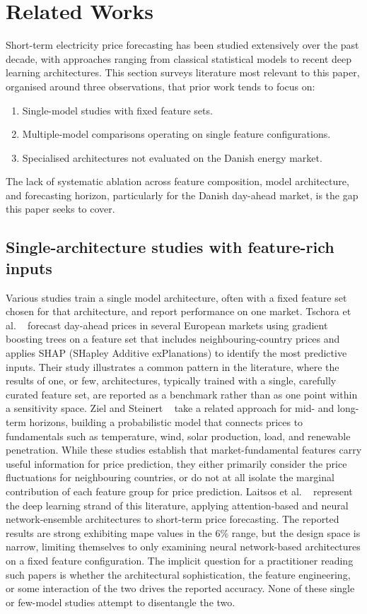 \section{Related Works} \label{sec:related-works}
Short-term electricity price forecasting has been studied
extensively over the past decade, with approaches ranging from
classical statistical models to recent deep 
learning architectures.
This section surveys literature most relevant to this paper,
organised around three observations, that prior work tends to
focus on:
\begin{enumerate}
	\item Single-model studies with fixed feature sets.
	\item Multiple-model comparisons operating on single feature
	configurations.
	\item Specialised architectures not evaluated on the Danish
	energy market.
\end{enumerate}
The lack of systematic ablation across feature composition, model architecture, 
and forecasting horizon, particularly for the Danish day-ahead market, is the 
gap this paper seeks to cover.
\subsection{Single-architecture studies with feature-rich inputs}
Various studies train a single model architecture, often with a
fixed feature set chosen for that architecture, and report performance on one 
market. Tschora et al. ~\cite{energyPricePredictionMLNeighbors} forecast 
day-ahead prices in several European markets using gradient boosting trees
on a feature set that includes neighbouring-country prices and
applies SHAP (SHapley Additive exPlanations) to identify the
most predictive inputs. Their study illustrates a common pattern
in the literature, where the results of one, or few, architectures,
typically trained with a single, carefully curated feature set,
are reported as a benchmark rather than as one point within a
sensitivity space. Ziel and Steinert ~\cite{forecastInput} take a related 
approach for mid- and long-term horizons, building a probabilistic model
that connects prices to fundamentals such as temperature,
wind, solar production, load, and renewable penetration. While
these studies establish that market-fundamental features carry
useful information for price prediction, they either primarily
consider the price fluctuations for neighbouring countries, or
do not at all isolate the marginal contribution of each feature
group for price prediction. Laitsos et al. 
~\cite{energyPricePredictionNovelDeepLearning} represent the
deep learning strand of this literature, applying 
attention-based
and neural network-ensemble architectures to short-term price
forecasting. The reported results are strong exhibiting \gls{mape} values in 
the 6\% range,
but the design space is narrow, limiting themselves to only
examining neural network-based architectures on a fixed feature
configuration. The implicit question for a practitioner reading
such papers is whether the architectural sophistication, the
feature engineering, or some interaction of the two drives the
reported accuracy. None of these single or few-model studies
attempt to disentangle the two.

